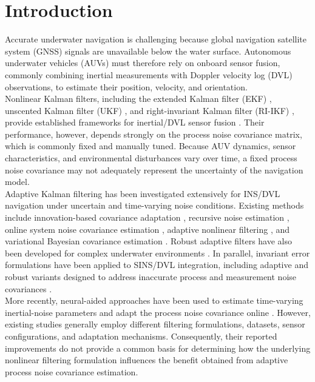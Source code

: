 \documentclass[conference]{IEEEtran}
\begin{document}
\section{Introduction}
\noindent Accurate underwater navigation is challenging because global navigation satellite system (GNSS) signals are unavailable below the water surface. Autonomous underwater vehicles (AUVs) must therefore rely on onboard sensor fusion, commonly combining inertial measurements with Doppler velocity log (DVL) observations, to estimate their position, velocity, and orientation. \\
\noindent Nonlinear Kalman filters, including the extended Kalman filter (EKF) \cite{10.5555/1594745,bar2011tracking}, unscented Kalman filter (UKF) \cite{wan2001unscented,simon2006optimal}, and right-invariant Kalman filter (RI-IKF) \cite{barrau2018invariant,barrau2017three,hartley2020contact}, provide established frameworks for inertial/DVL sensor fusion \cite{groves2013principles,klein2020continuous,damari2026ai,hu2025tightly,chen2024seamless}. Their performance, however, depends strongly on the process noise covariance matrix, which is commonly fixed and manually tuned. Because AUV dynamics, sensor characteristics, and environmental disturbances vary over time, a fixed process noise covariance may not adequately represent the uncertainty of the navigation model. \\
\noindent Adaptive Kalman filtering has been investigated extensively for INS/DVL navigation under uncertain and time-varying noise conditions. Existing methods include innovation-based covariance adaptation \cite{mohamed1999adaptive,magill1965optimal,meng2016covariance,mehra1972approaches}, recursive noise estimation \cite{gao2015adaptive}, online system noise covariance estimation \cite{wang2023system,kost2022measurement}, adaptive nonlinear filtering \cite{jin2023adaptive}, and variational Bayesian covariance estimation \cite{davari2019variational}. Robust adaptive filters have also been developed for complex underwater environments \cite{qian2023ins}. In parallel, invariant error formulations have been applied to SINS/DVL integration, including adaptive and robust variants designed to address inaccurate process and measurement noise covariances \cite{tang2023invariant,xu2024invariant}. \\
\noindent More recently, neural-aided approaches have been used to estimate time-varying inertial-noise parameters and adapt the process noise covariance online \cite{11361209,cohen2024inertial,diker2026neural,solodar2024vio}. However, existing studies generally employ different filtering formulations, datasets, sensor configurations, and adaptation mechanisms. Consequently, their reported improvements do not provide a common basis for determining how the underlying nonlinear filtering formulation influences the benefit obtained from adaptive process noise covariance estimation. \\
\end{document}
